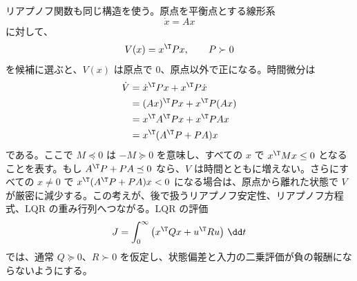 リアプノフ関数も同じ構造を使う。原点を平衡点とする線形系
\begin{equation}
  \dot{x}=Ax
\end{equation}
に対して、
\begin{equation}
  V(x)=x^\T P x,\qquad P\succ0
\end{equation}
を候補に選ぶと、$V(x)$ は原点で 0、原点以外で正になる。時間微分は
\begin{align}
  \dot{V}
  &=\dot{x}^\T P x+x^\T P\dot{x}\\
  &=(Ax)^\T P x+x^\T P(Ax)\\
  &=x^\T A^\T P x+x^\T P A x\\
  &=x^\T(A^\T P+PA)x
\end{align}
である。ここで $M\preceq0$ は $-M\succeq0$ を意味し、すべての $x$ で $x^\T Mx\le0$ となることを表す。もし $A^\T P+PA\preceq0$ なら、$V$ は時間とともに増えない。さらにすべての $x\ne0$ で $x^\T(A^\T P+PA)x<0$ になる場合は、原点から離れた状態で $V$ が厳密に減少する。この考えが、後で扱うリアプノフ安定性、リアプノフ方程式、LQR の重み行列へつながる。LQR の評価
\begin{equation}
  J=\int_0^\infty \left(x^\T Qx+u^\T Ru\right)\,\dd t
\end{equation}
では、通常 $Q\succeq0$、$R\succ0$ を仮定し、状態偏差と入力の二乗評価が負の報酬にならないようにする。

